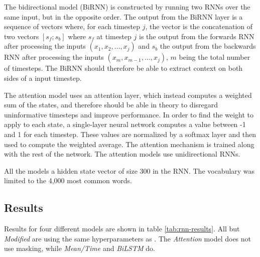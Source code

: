 The bidirectional model (BiRNN) is constructed by running two \acp{RNN} over
the same input, but in the opposite order. The output from the BiRNN layer is
a sequence of vectors where, for each timestep $j$, the vector is the
concatenation of two vectors $[s_f;s_b]$ where $s_f$ at timestep $j$ is the
output from the forwards \ac{RNN} after processing the inputs $(x_1, x_2,
\ldots, x_j)$ and $s_b$ the output from the backwards \ac{RNN} after
processing the inputs $(x_m, x_{m-1}, \ldots, x_j)$, $m$ being the total
number of timesteps. The BiRNN should therefore be able to extract context on
both sides of a input timestep.


The attention model uses an attention layer, which instead computes a
weighted sum of the states, and therefore should be able in theory to
disregard uninformative timesteps and improve performance. In order to find
the weight to apply to each state, a single-layer neural network computes a
value between -1 and 1 for each timestep. These values are normalized by a
softmax layer and then used to compute the weighted average. The attention
mechanism is trained along with the rest of the network. The attention models
use unidirectional \acp{RNN}.

All the models a hidden state vector of size 300 in the \ac{RNN}. The
vocabulary was limited to the 4,000 most common words.


\subsection{Results}

Results for four different models are shown in table \ref{tab:rnn-results}. All
but \emph{Modified} are using the same hyperparameters as
\citeauthor{taghipour16}. The \emph{Attention} model does not use masking,
while \emph{Mean/Time} and \emph{BiLSTM} do.

